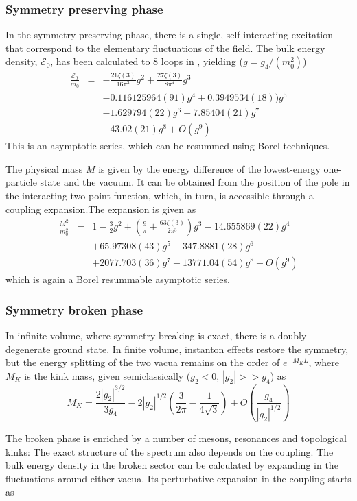 \documentclass[twocolumn,secnumarabic,amssymb, nobibnotes, aps, prd]{revtex4-2}
\newcommand{\be}{\begin{equation}}
\newcommand{\ee}{\end{equation}}
\newcommand{\bea}{\begin{eqnarray}}
\newcommand{\eea}{\end{eqnarray}}
\begin{document}
\subsubsection{Symmetry preserving phase}
In the symmetry preserving phase, there is a single, self-interacting excitation that correspond to the elementary fluctuations of the field.
The bulk energy density, $\mathcal{E}_0$, has been calculated to
$8$ loops in \cite{Serone:2018gjo}, yielding ($g=g_4/(m_0^2)$)
\bea
\frac{\mathcal{E}_0}{m_0}&=&-\frac{21 \zeta(3)}{16\pi^3}g^2+\frac{27\zeta(3)}{8\pi^4}g^3\nonumber\\
&&-0.116125964(91)g^4+0.3949534(18))g^5\nonumber\\
&&-1.629794(22)g^6+7.85404(21)g^7\nonumber\\
&&-43.02(21)g^8 +O(g^9)\label{phiE0pertser}
\eea
This is an asymptotic series, which can be resummed using Borel techniques. 

The physical mass $M$  
is given by the energy difference of the lowest-energy one-particle state and the vacuum. It can be obtained from the position of the pole in the interacting two-point function, which, in turn, is accessible through a coupling expansion.The expansion is given as \cite{Serone:2018gjo}
\bea
\frac{M^2}{m_0^2}&=&1-\frac32 g^2+\left(\frac{9}{\pi}+\frac{63\zeta(3)}{2\pi^3}\right)g^3 - 14.655869(22)g^4 \nonumber\\
&& + 65.97308(43)g^5 - 347.8881(28) g^6 \nonumber \\
&&  +2077.703(36)g^7 - 13771.04(54) g^8 + O(g^9)
\eea
which is again a Borel resummable asymptotic series.

\subsubsection{Symmetry broken phase}
In infinite volume, where symmetry breaking is exact, there is a doubly degenerate ground state. In finite volume, instanton effects restore the symmetry, but the energy splitting of the two vacua remains on the order of $e^{-M_K L}$, where $M_K$ is the kink mass, given semiclassically ($g_2<0$, $|g_2|>>g_4$) as \cite{Dashen:1975hd,Evslin:2021gxs}
\be
M_K=\frac{2|g_2|^{3/2}}{3g_4}-2|g_2|^{1/2}\left(\frac{3}{2\pi}-\frac{1}{4\sqrt{3}}\right)+O\left(\frac{g_4}{|g_2|^{1/2}}\right)\label{kinkmassSC}
\ee


The broken phase is enriched by a number of mesons, resonances and topological kinks: The exact structure of the spectrum also depends on the coupling.
The bulk energy density in the broken sector can be calculated by expanding in the fluctuations around either vacua. Its perturbative expansion in the coupling starts as \cite{Serone:2019szm}
\end{document}
